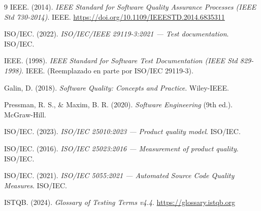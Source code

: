\documentclass[12pt, letterpaper]{article}
\begin{document}
\begin{thebibliography}{9}
IEEE. (2014). \textit{IEEE Standard for Software Quality Assurance Processes (IEEE Std 730-2014)}. IEEE. \url{https://doi.org/10.1109/IEEESTD.2014.6835311}

ISO/IEC. (2022). \textit{ISO/IEC/IEEE 29119-3:2021 — Test documentation}. ISO/IEC.

IEEE. (1998). \textit{IEEE Standard for Software Test Documentation (IEEE Std 829-1998)}. IEEE. (Reemplazado en parte por ISO/IEC 29119-3).

Galin, D. (2018). \textit{Software Quality: Concepts and Practice}. Wiley-IEEE.

Pressman, R. S., \& Maxim, B. R. (2020). \textit{Software Engineering} (9th ed.). McGraw-Hill.

ISO/IEC. (2023). \textit{ISO/IEC 25010:2023 — Product quality model}. ISO/IEC.

ISO/IEC. (2016). \textit{ISO/IEC 25023:2016 — Measurement of product quality}. ISO/IEC.

ISO/IEC. (2021). \textit{ISO/IEC 5055:2021 — Automated Source Code Quality Measures}. ISO/IEC.

ISTQB. (2024). \textit{Glossary of Testing Terms v4.4}. \url{https://glossary.istqb.org}
\end{thebibliography}
\end{document}
